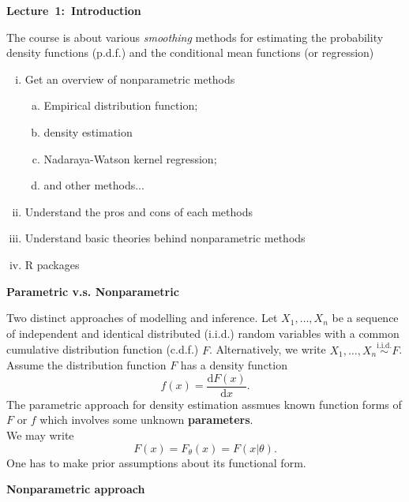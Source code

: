 \documentclass[19pt,landscaoe]{article}
\begin{document}
\newpage
{\LARGE\centerline{\textbf{Lecture~1:~Introduction}}}
\vskip25pt
\begin{minipage}{.9\textwidth}
    \Large
    The course is about various {\it smoothing} methods for estimating the probability density functions (p.d.f.) and the conditional mean functions (or regression)
\begin{enumerate}[(i)]
\item Get an overview of nonparametric methods
\begin{enumerate}[a)]
    \item Empirical distribution function;
    \item density estimation
    \item Nadaraya-Watson kernel regression;
    \item and other methods...
\end{enumerate}
\item Understand the pros and cons of each methods
\item Understand basic theories behind nonparametric methods
\item R packages
\end{enumerate}
\end{minipage}
\newpage
{\Large\centerline{\textbf{Parametric v.s. Nonparametric}}}
\vskip25pt
\begin{minipage}{.9\textwidth}
    \Large
Two distinct approaches of modelling and inference. 
\vskip 5pt
Let $X_1,\dots,X_n$ be a sequence of independent and identical distributed (i.i.d.) random variables with a common cumulative distribution function (c.d.f.) $F$. Alternatively, we write $X_1,\dots,X_n\overset{\mathrm{i.i.d.}}{\sim}F$. \\Assume the distribution function $F$ has a density function $$f(x)=\frac{\mathrm{d}F(x)}{\mathrm{d}x}.$$  
The parametric approach for density estimation assmues known function forms of $F$ or $f$ which involves some unknown {\bf parameters}.\\ We may write
$$F(x)=F_\theta(x)=F(x|\theta).$$
One has to make prior assumptions about its functional form.
\end{minipage}
\newpage
{\LARGE\centerline{\textbf{Nonparametric approach }}}
\vskip25pt
\end{document}
